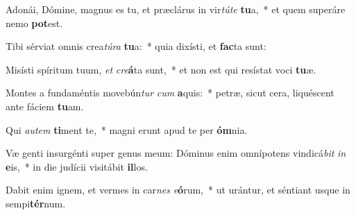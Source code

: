 \item Adonái, Dómine, magnus es tu, et præclárus in vir\textit{tú}\textit{te} \textbf{tu}a,~* et quem superáre nemo \textbf{pot}est.
\item Tibi sérviat omnis crea\textit{tú}\textit{ra} \textbf{tu}a:~* quia dixísti, et \textbf{fac}ta sunt:
\item Misísti spíritum tuum, \textit{et} \textit{cre}\textbf{á}ta sunt,~* et non est qui resístat voci \textbf{tu}æ.
\item Montes a fundaméntis movebún\textit{tur} \textit{cum} \textbf{a}quis:~* petræ, sicut cera, liquéscent ante fáciem \textbf{tu}am.
\item Qui \textit{au}\textit{tem} \textbf{ti}ment te,~* magni erunt apud te per \textbf{óm}nia.
\item Væ genti insurgénti super genus meum: Dóminus enim omnípotens vindicá\textit{bit} \textit{in} \textbf{e}is,~* in die judícii visitábit \textbf{il}los.
\item Dabit enim ignem, et vermes in car\textit{nes} \textit{e}\textbf{ó}rum,~* ut urántur, et séntiant usque in sempi\textbf{tér}num.
